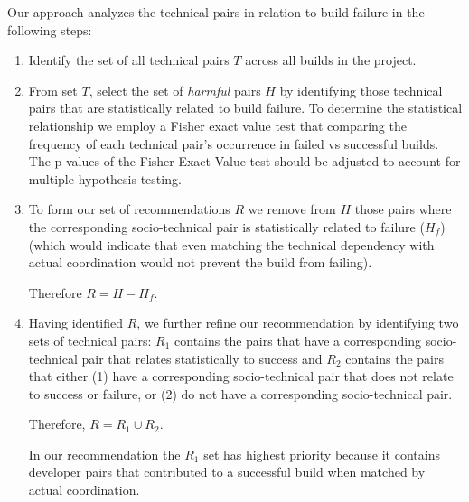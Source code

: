 
Our approach analyzes the technical pairs in relation to build failure in the following steps:

\begin{enumerate}
\item Identify the set of all technical pairs $T$ across all builds in the project.

\item From set $T$, select the set of \emph{harmful} pairs $H$ by identifying those technical pairs that are statistically related to build failure. To determine the statistical relationship we employ a Fisher exact value test that comparing the frequency of each technical pair's occurrence in failed vs successful builds. The p-values of the Fisher Exact Value test should be adjusted to account for multiple hypothesis testing.


\item To form our set of recommendations $R$  we remove from $H$ those pairs where the corresponding socio-technical pair is statistically related to failure ($H_f$) (which would indicate that even matching the technical dependency with actual coordination would not prevent the build from failing). 

Therefore $R = H - H_f$.



\item Having identified $R$, we further refine our recommendation by identifying two sets of technical pairs: $R_1$ contains the pairs that have a corresponding socio-technical pair that relates statistically to success and $R_2$ contains the pairs that either (1) have a corresponding socio-technical pair that does not relate to success or failure, or (2) do not have a corresponding socio-technical pair.

Therefore, $R = R_1 \cup R_2$.

In our recommendation the $R_1$ set has highest priority because it contains developer pairs that contributed to a successful build when matched by actual coordination.  


\end{enumerate}
